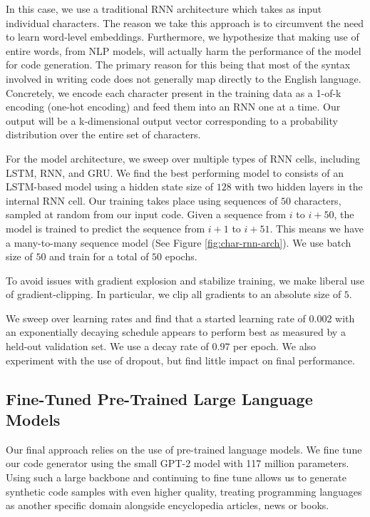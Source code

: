 \documentclass[10pt,twocolumn]{article}
\begin{document}
In this case, we use a traditional RNN architecture which takes as input individual characters. The reason we take this approach is to circumvent the need to learn word-level embeddings. Furthermore, we hypothesize that making use of entire words, from NLP models, will actually harm the performance of the model for code generation. The primary reason for this being that most of the syntax involved in writing code does not generally map directly to the English language. 
Concretely, we encode each character present in the training data as a 1-of-k encoding (one-hot encoding) and feed them into an RNN one at a time. Our output will be a k-dimensional output vector corresponding to a probability distribution over the entire set of characters.

For the model architecture, we sweep over multiple types of RNN cells, including LSTM, RNN, and GRU. We find the best performing model to consists of an LSTM-based model using a  hidden state size of $128$ with two hidden layers in the internal RNN cell. Our training takes place using sequences of $50$ characters, sampled at random from our input code. Given a sequence from $i$ to $i + 50$, the model is trained to predict the sequence from $i + 1$ to $i + 51$. This means we have a many-to-many sequence model (See Figure \ref{fig:char-rnn-arch}). We use batch size of $50$ and train for a total of $50$ epochs. 

To avoid issues with gradient explosion and stabilize training, we make liberal use of gradient-clipping. In particular, we clip all gradients to an absolute size of $5$. 

We sweep over learning rates and find that a started learning rate of $0.002$ with an exponentially decaying schedule appears to perform best as measured by a held-out validation set. We use a decay rate of $0.97$ per epoch. We also experiment with the use of dropout, but find little impact on final performance.

\subsection{Fine-Tuned Pre-Trained Large Language Models}
Our final approach relies on the use of pre-trained language models. We fine tune our code generator using the small GPT-2 model with 117 million parameters. Using such a large backbone and continuing to fine tune allows us to generate synthetic code samples with even higher quality, treating programming languages as another specific domain alongside encyclopedia articles, news or books.
\end{document}
